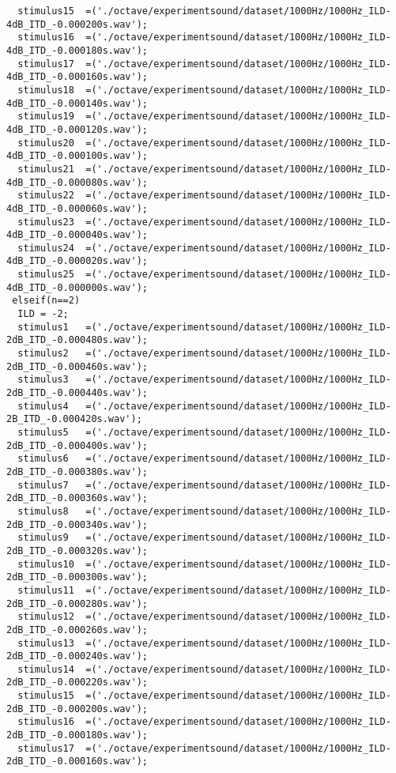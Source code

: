 {\begin{verbatim}
  stimulus15  =('./octave/experimentsound/dataset/1000Hz/1000Hz_ILD-4dB_ITD_-0.000200s.wav');
  stimulus16  =('./octave/experimentsound/dataset/1000Hz/1000Hz_ILD-4dB_ITD_-0.000180s.wav');
  stimulus17  =('./octave/experimentsound/dataset/1000Hz/1000Hz_ILD-4dB_ITD_-0.000160s.wav');
  stimulus18  =('./octave/experimentsound/dataset/1000Hz/1000Hz_ILD-4dB_ITD_-0.000140s.wav');
  stimulus19  =('./octave/experimentsound/dataset/1000Hz/1000Hz_ILD-4dB_ITD_-0.000120s.wav');
  stimulus20  =('./octave/experimentsound/dataset/1000Hz/1000Hz_ILD-4dB_ITD_-0.000100s.wav');
  stimulus21  =('./octave/experimentsound/dataset/1000Hz/1000Hz_ILD-4dB_ITD_-0.000080s.wav');
  stimulus22  =('./octave/experimentsound/dataset/1000Hz/1000Hz_ILD-4dB_ITD_-0.000060s.wav');
  stimulus23  =('./octave/experimentsound/dataset/1000Hz/1000Hz_ILD-4dB_ITD_-0.000040s.wav');
  stimulus24  =('./octave/experimentsound/dataset/1000Hz/1000Hz_ILD-4dB_ITD_-0.000020s.wav');
  stimulus25  =('./octave/experimentsound/dataset/1000Hz/1000Hz_ILD-4dB_ITD_-0.000000s.wav');
 elseif(n==2)
  ILD = -2;
  stimulus1   =('./octave/experimentsound/dataset/1000Hz/1000Hz_ILD-2dB_ITD_-0.000480s.wav');
  stimulus2   =('./octave/experimentsound/dataset/1000Hz/1000Hz_ILD-2dB_ITD_-0.000460s.wav');
  stimulus3   =('./octave/experimentsound/dataset/1000Hz/1000Hz_ILD-2dB_ITD_-0.000440s.wav');
  stimulus4   =('./octave/experimentsound/dataset/1000Hz/1000Hz_ILD-2B_ITD_-0.000420s.wav');
  stimulus5   =('./octave/experimentsound/dataset/1000Hz/1000Hz_ILD-2dB_ITD_-0.000400s.wav');
  stimulus6   =('./octave/experimentsound/dataset/1000Hz/1000Hz_ILD-2dB_ITD_-0.000380s.wav');
  stimulus7   =('./octave/experimentsound/dataset/1000Hz/1000Hz_ILD-2dB_ITD_-0.000360s.wav');
  stimulus8   =('./octave/experimentsound/dataset/1000Hz/1000Hz_ILD-2dB_ITD_-0.000340s.wav');
  stimulus9   =('./octave/experimentsound/dataset/1000Hz/1000Hz_ILD-2dB_ITD_-0.000320s.wav');
  stimulus10  =('./octave/experimentsound/dataset/1000Hz/1000Hz_ILD-2dB_ITD_-0.000300s.wav');
  stimulus11  =('./octave/experimentsound/dataset/1000Hz/1000Hz_ILD-2dB_ITD_-0.000280s.wav');
  stimulus12  =('./octave/experimentsound/dataset/1000Hz/1000Hz_ILD-2dB_ITD_-0.000260s.wav');
  stimulus13  =('./octave/experimentsound/dataset/1000Hz/1000Hz_ILD-2dB_ITD_-0.000240s.wav');
  stimulus14  =('./octave/experimentsound/dataset/1000Hz/1000Hz_ILD-2dB_ITD_-0.000220s.wav');
  stimulus15  =('./octave/experimentsound/dataset/1000Hz/1000Hz_ILD-2dB_ITD_-0.000200s.wav');
  stimulus16  =('./octave/experimentsound/dataset/1000Hz/1000Hz_ILD-2dB_ITD_-0.000180s.wav');
  stimulus17  =('./octave/experimentsound/dataset/1000Hz/1000Hz_ILD-2dB_ITD_-0.000160s.wav');

\end{verbatim}}
